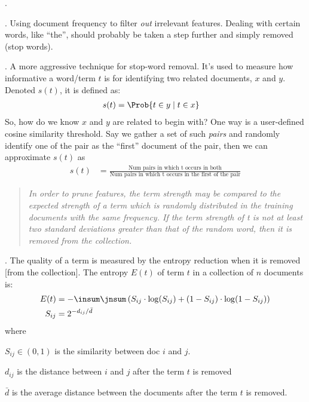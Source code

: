 \documentclass[11pt]{article}
\begin{document}
\p {}. 
\begin{compactitem}
	\item {}. Using document frequency to filter \textit{out} irrelevant features. Dealing with certain words, like ``the'', should probably be taken a step further and simply removed (stop words). 
	
	\item {}. A more aggressive technique for stop-word removal. It's used to measure how informative a word/term $t$ is for identifying two related documents, $x$ and $y$. Denoted $s(t)$, it is defined as:
	\begin{align}
		s(t) &= \Prob{t \in y \mid t \in x}
	\end{align}
	So, how do we know $x$ and $y$ are related to begin with? One way is a user-defined cosine similarity threshold. Say we gather a set of such \textit{pairs} and randomly identify one of the pair as the ``first'' document of the pair, then we can approximate $s(t)$ as
	\begin{align}
		s(t) &= \frac{ \text{Num pairs in which t occurs in both}   }{ \text{Num pairs in which t occurs in the first of the pair}  }
	\end{align}
	
	\begin{quote}
		\textit{{\small In order to prune features, the term strength may be compared to the expected strength of a term which is randomly distributed in the training documents with the same frequency. If the term strength of t is not at least two standard deviations greater than that of the random word, then it is removed from the collection.}}
	\end{quote}
	
	\item {}. The quality of a term is measured by the entropy reduction when it is removed [from the collection]. The entropy $E(t)$ of term $t$ in a collection of $n$ documents is:
	\begin{align}
		E(t) &= - \insum \jnsum \left( S_{ij} \cdot \log(S_{ij}) 
		+ (1 - S_{ij}) \cdot \log(1 - S_{ij})\right)\\
		S_{ij} &= 2^{-d_{ij} / \bar d }
	\end{align}
	where
	\begin{compactitem}
		\item $S_{ij} \in (0, 1)$ is the similarity between doc $i$ and $j$.
		\item $d_{ij}$ is the distance between $i$ and $j$ after the term $t$ is removed
		\item $\bar d$ is the average distance between the documents after the term $t$ is removed.
	\end{compactitem} 
\end{compactitem}
\end{document}
